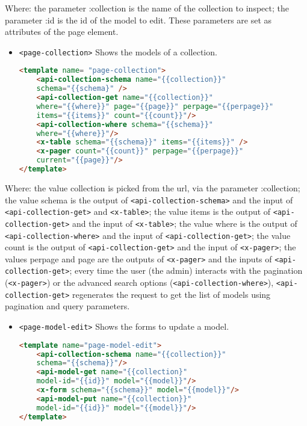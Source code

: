 Where: the parameter :collection is the name of the collection to inspect; the parameter :id is the id of the model to edit. These parameters are set as attributes of the page element.

\begin{itemize} \item \texttt{<page-collection>} Shows the models of a collection.
\begin{lstlisting}[language=html]
<template name= "page-collection">
	<api-collection-schema name="{{collection}}" 
	schema="{{schema}" />
	<api-collection-get name="{{collection}}" 
	where="{{where}}" page="{{page}}" perpage="{{perpage}}"
	items="{{items}}" count="{{count}}"/>
	<api-collection-where schema="{{schema}}" 
	where="{{where}}"/>
	<x-table schema="{{schema}}" items="{{items}}" />
	<x-pager count="{{count}}" perpage="{{perpage}}" 
	current="{{page}}"/>
</template>
\end{lstlisting}
\end{itemize}

Where: the value collection is picked from the url, via the parameter :collection; the value schema is the output of \texttt{<api-collection-schema>} and the input of \texttt{<api-collection-get>} and \texttt{<x-table>}; the value items is the output of \texttt{<api-collection-get>} and the input of \texttt{<x-table>}; the value where is the output of \texttt{<api-collection-where>} and the input of \texttt{<api-collection-get>}; the value count is the output of \texttt{<api-collection-get>} and the input of \texttt{<x-pager>}; the values perpage and page are the outputs of \texttt{<x-pager>} and the inputs of \texttt{<api-collection-get>}; every time the user (the admin) interacts with the pagination (\texttt{<x-pager>}) or the advanced search options (\texttt{<api-collection-where>}), \texttt{<api-collection-get>} regenerates the request to get the list of models using pagination and query parameters.


\begin{itemize} \item \texttt{<page-model-edit>} Shows the forms to update a model.
\begin{lstlisting}[language=html]
<template name="page-model-edit">
	<api-collection-schema name="{{collection}}"
	schema="{{schema}}"/>
	<api-model-get name="{{collection}"
	model-id="{{id}}" model="{{model}}"/>
	<x-form schema="{{schema}}" model="{{model}}"/>
	<api-model-put name="{{collection}}"
	model-id="{{id}}" model="{{model}}"/>
</template>
\end{lstlisting}
\end{itemize}

